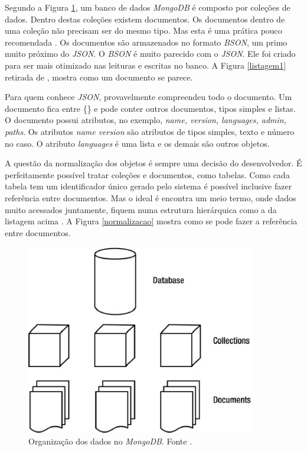 Segundo a Figura \ref{mongodb}, um banco de dados \emph{MongoDB} é composto por coleções de dados. 
Dentro destas coleções existem documentos. 
Os documentos dentro de uma coleção não precisam ser do mesmo tipo. 
Mas esta é uma prática pouco recomendada \cite{Plugge2014}. 
Os documentos são armazenados no formato \emph{BSON}, um primo muito próximo do \emph{JSON}. 
O \emph{BSON} é muito parecido com o \emph{JSON}. Ele foi criado para ser mais otimizado nas leituras e escritas no banco. A Figura \ref{listagem1} retirada de , mostra como um documento se parece.

Para quem conhece \emph{JSON}, provavelmente compreendeu todo o documento. Um documento fica entre \{\} e pode conter outros documentos, tipos simples e listas.
O documento possui atributos, no exemplo, \emph{name, version, languages, admin, paths}. Os atributos \emph{name version} são atributos de tipos simples, texto e número no caso. O atributo \emph{languages} é uma lista e os demais são outros objetos.

A questão da normalização dos objetos é sempre uma decisão do desenvolvedor. É perfeitamente possível tratar coleções e documentos, como tabelas. Como cada tabela tem um identificador único gerado pelo sistema é possível inclusive fazer referência entre documentos. Mas o ideal é encontra um meio termo, onde dados muito acessados juntamente, fiquem numa estrutura hierárquica como a da listagem acima \cite{Dayley2014}. A Figura \ref{normalizacao} mostra como se pode fazer a referência entre documentos.

\begin{figure}[ht]
	\centering
	\includegraphics[width=10cm]{figuras/mongodb.eps}
	\caption{Organização dos dados no \emph{MongoDB}. Fonte \cite{Plugge2014}.}
	\label{mongodb}
\end{figure}


